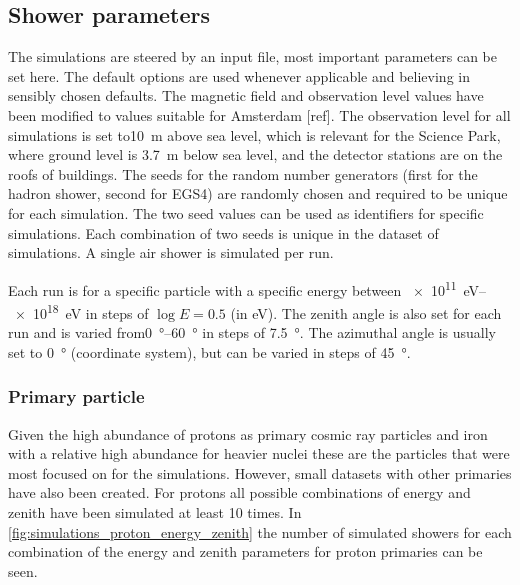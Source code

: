 

\subsection{Shower parameters}

The simulations are steered by an input file, most important parameters can be set here. The default options are used whenever applicable and believing in sensibly chosen defaults. The magnetic field and observation level values have been modified to values suitable for Amsterdam [ref]. The observation level for all simulations is set to\SI{10}{\meter} above sea level, which is relevant for the Science Park, where ground level is \SI{3.7}{\meter} below sea level, and the detector stations are on the roofs of buildings. The seeds for the random number generators (first for the hadron shower, second for EGS4) are randomly chosen and required to be unique for each simulation. The two seed values can be used as identifiers for specific simulations. Each combination of two seeds is unique in the dataset of simulations. A single air shower is simulated per run.

Each run is for a specific particle with a specific energy between \SIrange{e11}{e18}{\eV} in steps of $\log E = 0.5$ (in \si{\eV}). The zenith angle is also set for each run and is varied from\SIrange{0}{60}{\degree} in steps of \SI{7.5}{\degree}. The azimuthal angle is usually set to \SI{0}{\degree} (\hisparc coordinate system), but can be varied in steps of \SI{45}{\degree}.


\subsubsection{Primary particle}

Given the high abundance of protons as primary cosmic ray particles and iron with a relative high abundance for heavier nuclei these are the particles that were most focused on for the simulations. However, small datasets with other primaries have also been created. For protons all possible combinations of energy and zenith have been simulated at least 10 times. In \cref{fig:simulations_proton_energy_zenith} the number of simulated showers for each combination of the energy and zenith parameters for proton primaries can be seen.


